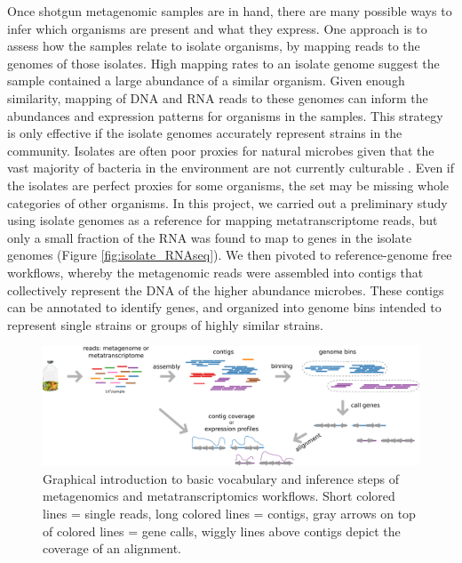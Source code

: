 Once shotgun metagenomic samples are in hand, there are many possible ways to infer which organisms are present and what they express.
One approach is to assess how the samples relate to isolate organisms, by mapping reads to the genomes of those isolates.
High mapping rates to an isolate genome suggest the sample contained a large abundance of a similar organism.
Given enough similarity, mapping of DNA and RNA reads to these genomes can inform the abundances and expression patterns for organisms in the samples.
This strategy is only effective if the isolate genomes accurately represent strains in the community.
Isolates are often poor proxies for natural microbes given that the vast majority of bacteria in the environment are not currently culturable \cite{kaeberlein2002, stewart2012}.
Even if the isolates are perfect proxies for some organisms, the set may be missing whole categories of other organisms.
In this project, we carried out a preliminary study using isolate genomes as a reference for mapping metatranscriptome reads, but only a small fraction of the RNA was found to map to genes in the isolate genomes (Figure \ref{fig:isolate_RNAseq}).
We then pivoted to reference-genome free workflows, whereby the metagenomic reads were assembled into contigs that collectively represent the DNA of the higher abundance microbes.
These contigs can be annotated to identify genes, and organized into genome bins intended to represent single strains or groups of highly similar strains.

\begin{figure}[H]
\centering
    \includegraphics[width=1.0\textwidth]{./tex/chapter2/figures/170312_metagenomics_metatranscriptomics_overview.pdf}
    \begin{singlespace}
    \caption[Overview of elements in metagenomics/metatranscriptomics workflows]{
       Graphical introduction to basic vocabulary and inference steps of metagenomics and metatranscriptomics workflows.
	   Short colored lines = single reads, long colored lines = contigs,
	   gray arrows on top of colored lines = gene calls, wiggly lines above contigs depict the coverage of an alignment.}
    \label{fig:meta_workflow}
    \end{singlespace}
\end{figure}

